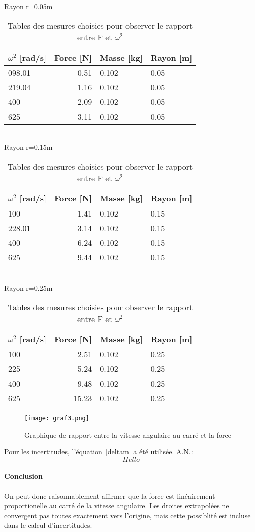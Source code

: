 \begin{table}[ht]
    \caption[Tables mesures vitesse angulaire force]{Tables des mesures choisies pour observer le rapport entre F et $\omega^2$}
    \centering

    Rayon r=0.05m\\[1px]
    \begin{tabular}{|l|r|l|l|}
	\hline
	$\omega^2$ [rad/s] & Force [N] & Masse [kg] & Rayon [m]\\
	\hline
	098.01	&0.51	&0.102	&0.05\\
	219.04	&1.16	&0.102	&0.05\\
	400	&2.09	&0.102	&0.05\\
	625	&3.11	&0.102	&0.05\\
	\hline
    \end{tabular}\\[5px]

    Rayon r=0.15m\\[1px]
    \begin{tabular}{|l|r|l|l|}
	\hline
	$\omega^2$ [rad/s] & Force [N] & Masse [kg] & Rayon [m]\\
	\hline
	100	&1.41	&0.102	&0.15\\
	228.01	&3.14	&0.102	&0.15\\
	400	&6.24	&0.102	&0.15\\
	625	&9.44	&0.102	&0.15\\
	\hline
    \end{tabular}\\[5px]

    Rayon r=0.25m\\[1px]
    \begin{tabular}{|l|r|l|l|}
	\hline
	$\omega^2$ [rad/s] & Force [N] & Masse [kg] & Rayon [m]\\
	\hline
	100	&2.51	&0.102	&0.25\\
	225	&5.24	&0.102	&0.25\\
	400	&9.48	&0.102	&0.25\\
	625	&15.23	&0.102	&0.25\\
	\hline
    \end{tabular}
\end{table}

\begin{figure}[!h]
    \caption[Graphique $\omega^2$ force]{Graphique de rapport entre la vitesse angulaire au carré et la force}
    \centering
    \texttt{[image: graf3.png]}
\end{figure}

Pour les incertitudes, l'équation~\eqref{deltam} a été utilisée.
A.N.:
\begin{equation}
	Hello
\end{equation}

\paragraph{Conclusion}

On peut donc raisonnablement affirmer que la force est linéairement proportionelle au carré de la vitesse angulaire.
Les droites extrapolées ne convergent pas toutes exactement vers l'origine, mais cette possiblité est incluse dans le calcul d'incertitudes.

